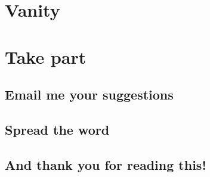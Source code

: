 \documentclass[12pt]{report}
\begin{document}
\chapter{Vanity}

\chapter*{Take part}
\section*{Email me your suggestions}
\section*{Spread the word}
\section*{And thank you for reading this!}
\end{document}
